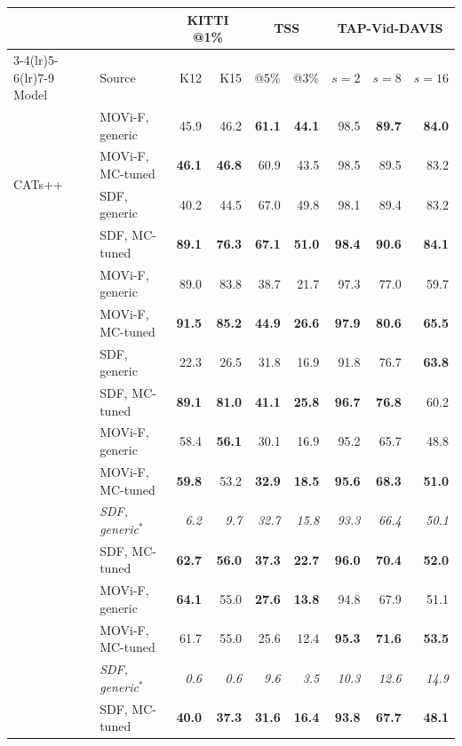 \begin{tabular}{ll rr rr rrr}
\toprule
 &  & \multicolumn{2}{c}{KITTI @1\%} & \multicolumn{2}{c}{TSS} & \multicolumn{3}{c}{TAP-Vid-DAVIS} \\
\cmidrule(lr){3-4}\cmidrule(lr){5-6}\cmidrule(lr){7-9}
Model & Source & K12 & K15 & @5\% & @3\% & $s{=}2$ & $s{=}8$ & $s{=}16$ \\
\midrule
\multirow{4}{*}{CATs++}
 & MOVi-F, generic & 45.9 & 46.2 & \textbf{61.1} & \textbf{44.1} & 98.5 & \textbf{89.7} & \textbf{84.0} \\
 & MOVi-F, MC-tuned & \textbf{46.1} & \textbf{46.8} & 60.9 & 43.5 & 98.5 & 89.5 & 83.2 \\
 & SDF, generic    & 40.2 & 44.5 & 67.0 & 49.8 & 98.1 & 89.4 & 83.2 \\
 & SDF, MC-tuned    & \textbf{89.1} & \textbf{76.3} & \textbf{67.1} & \textbf{51.0} & \textbf{98.4} & \textbf{90.6} & \textbf{84.1} \\
\addlinespace[3pt]
\multirow{4}{*}{GLU-Net}
 & MOVi-F, generic & 89.0 & 83.8 & 38.7 & 21.7 & 97.3 & 77.0 & 59.7 \\
 & MOVi-F, MC-tuned & \textbf{91.5} & \textbf{85.2} & \textbf{44.9} & \textbf{26.6} & \textbf{97.9} & \textbf{80.6} & \textbf{65.5} \\
 & SDF, generic    & 22.3 & 26.5 & 31.8 & 16.9 & 91.8 & 76.7 & \textbf{63.8} \\
 & SDF, MC-tuned    & \textbf{89.1} & \textbf{81.0} & \textbf{41.1} & \textbf{25.8} & \textbf{96.7} & \textbf{76.8} & 60.2 \\
\addlinespace[3pt]
\multirow{4}{*}{FlowFormer}
 & MOVi-F, generic & 58.4 & \textbf{56.1} & 30.1 & 16.9 & 95.2 & 65.7 & 48.8 \\
 & MOVi-F, MC-tuned & \textbf{59.8} & 53.2 & \textbf{32.9} & \textbf{18.5} & \textbf{95.6} & \textbf{68.3} & \textbf{51.0} \\
 & \textit{SDF, generic}$^{*}$ & \textit{6.2} & \textit{9.7} & \textit{32.7} & \textit{15.8} & \textit{93.3} & \textit{66.4} & \textit{50.1} \\
 & SDF, MC-tuned    & \textbf{62.7} & \textbf{56.0} & \textbf{37.3} & \textbf{22.7} & \textbf{96.0} & \textbf{70.4} & \textbf{52.0} \\
\addlinespace[3pt]
\multirow{4}{*}{RAFT}
 & MOVi-F, generic & \textbf{64.1} & 55.0 & \textbf{27.6} & \textbf{13.8} & 94.8 & 67.9 & 51.1 \\
 & MOVi-F, MC-tuned & 61.7 & 55.0 & 25.6 & 12.4 & \textbf{95.3} & \textbf{71.6} & \textbf{53.5} \\
 & \textit{SDF, generic}$^{*}$ & \textit{0.6} & \textit{0.6} & \textit{9.6} & \textit{3.5} & \textit{10.3} & \textit{12.6} & \textit{14.9} \\
 & SDF, MC-tuned    & \textbf{40.0} & \textbf{37.3} & \textbf{31.6} & \textbf{16.4} & \textbf{93.8} & \textbf{67.7} & \textbf{48.1} \\
\bottomrule
\end{tabular}
